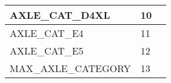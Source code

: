 \documentclass{template/openetcs_article}
\begin{document}
\begin{longtable}{|l|l|l|}
	\hline
		\begin{minipage}[t]{0.45\linewidth} AXLE\_CAT\_D4XL \end{minipage} 
	&	\begin{minipage}[t]{0.10\linewidth} 10 \end{minipage} 
	&	\begin{minipage}[t]{0.50\linewidth} \end{minipage}\\
	\hline
		\begin{minipage}[t]{0.45\linewidth} AXLE\_CAT\_E4 \end{minipage} 
	&	\begin{minipage}[t]{0.10\linewidth} 11\end{minipage} 
	&	\begin{minipage}[t]{0.50\linewidth} \end{minipage}\\
	\hline
		\begin{minipage}[t]{0.45\linewidth} AXLE\_CAT\_E5 \end{minipage} 
	&	\begin{minipage}[t]{0.10\linewidth} 12 \end{minipage} 
	&	\begin{minipage}[t]{0.50\linewidth} \end{minipage}\\
	\hline
		\begin{minipage}[t]{0.45\linewidth} MAX\_AXLE\_CATEGORY \end{minipage} 
	&	\begin{minipage}[t]{0.10\linewidth} 13 \end{minipage} 
	&	\begin{minipage}[t]{0.50\linewidth} \end{minipage}\\
	\hline
\end{longtable}
\end{document}
